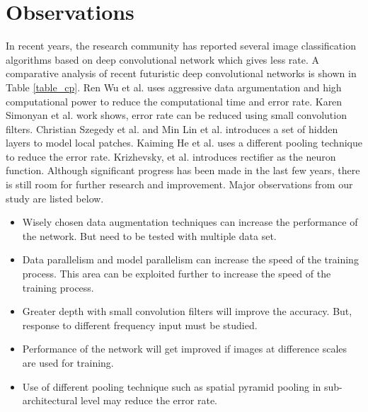 \documentclass{article}
\begin{document}
 \section {Observations}
In recent years, the research community has reported several image classification algorithms based on deep convolutional network which gives less rate. A comparative analysis of recent futuristic deep convolutional networks is shown in Table \ref{table_cp}.
  Ren Wu et al. \cite{Wu2015} uses aggressive data argumentation and high computational power to reduce the computational time and error rate. Karen Simonyan et al. \cite{Arge2015} work shows, error rate can be reduced using small convolution filters. Christian Szegedy  et al. \cite{Szegedy} and Min Lin et al. \cite{Lin2013} introduces a set of hidden layers to model local patches. Kaiming He et al. \cite{He2014} uses a different pooling technique to reduce the error rate. Krizhevsky, et al. \cite{Krizhevsky2012a}  introduces  rectifier  as the neuron function. Although significant progress has been made in the last few years, there is still room for further research and improvement. Major observations from our study are listed below.
 \begin{itemize}
 \itemsep0em 
 \item  Wisely chosen data  augmentation techniques can increase the performance of the network. But need to be tested with multiple data set.
 \item Data parallelism and model parallelism can increase the speed of the training process. This area can be exploited further to increase the speed of the training process.
 \item Greater depth with small convolution filters will improve the accuracy. But, response to different frequency input must be studied.
 \item Performance of the network will get improved if images at difference scales are used for training.
 \item Use of different pooling technique such as spatial pyramid pooling in sub-architectural level may reduce the error rate. 
 \end{itemize}
 
 
\end{document}
